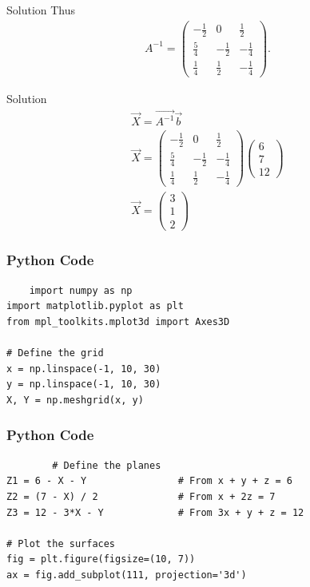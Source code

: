 \documentclass{beamer}
\begin{document}
\begin{frame}{Solution}
Thus
\begin{align}
A^{-1}=\begin{pmatrix}
-\tfrac12 & 0 & \tfrac12\\[6pt]
\tfrac54 & -\tfrac12 & -\tfrac14\\[6pt]
\tfrac14 & \tfrac12 & -\tfrac14
\end{pmatrix}.
\end{align}   
\end{frame}
\begin{frame}{Solution}
\begin{align}
   \vec{X}=\vec{A^{-1}} \vec{b}\\
   \vec{X}
   =\begin{pmatrix}
-\tfrac12 & 0 & \tfrac12\\[4pt]
\tfrac54 & -\tfrac12 & -\tfrac14\\[4pt]
\tfrac14 & \tfrac12 & -\tfrac14
\end{pmatrix}
\begin{pmatrix}6\\[2pt]7\\[2pt]12\end{pmatrix}\\
\vec{X}=\begin{pmatrix}
    3 \\ 1 \\ 2
\end{pmatrix}
\end{align}
\end{frame}
\begin{frame}[fragile]
\frametitle{Python Code}
\begin{lstlisting}
    import numpy as np
import matplotlib.pyplot as plt
from mpl_toolkits.mplot3d import Axes3D

# Define the grid
x = np.linspace(-1, 10, 30)
y = np.linspace(-1, 10, 30)
X, Y = np.meshgrid(x, y)
\end{lstlisting}
\end{frame}
\begin{frame}[fragile]
\frametitle{Python Code}
    \begin{lstlisting}
        # Define the planes
Z1 = 6 - X - Y                # From x + y + z = 6
Z2 = (7 - X) / 2              # From x + 2z = 7
Z3 = 12 - 3*X - Y             # From 3x + y + z = 12

# Plot the surfaces
fig = plt.figure(figsize=(10, 7))
ax = fig.add_subplot(111, projection='3d')

    \end{lstlisting}
\end{frame}
\end{document}
